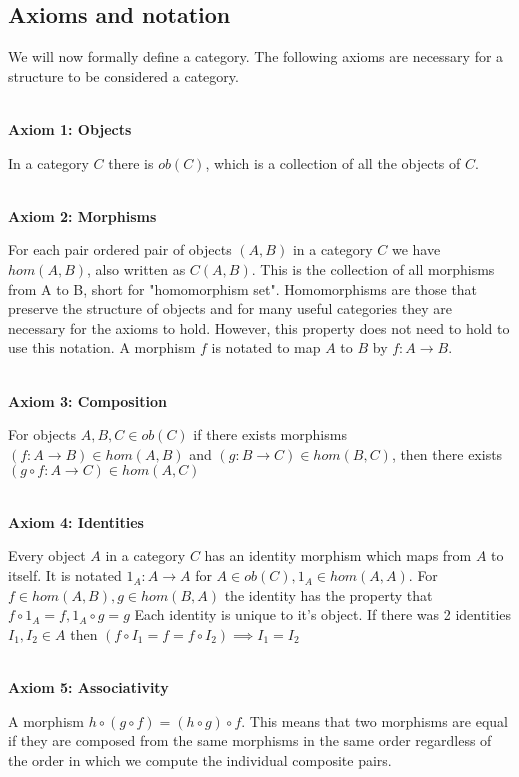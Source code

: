 \documentclass[10pt,a4paper]{amsart}
\begin{document}
\subsection{Axioms and notation}
\begin{flushleft}
We will now formally define a category. The following axioms are necessary for a structure to be considered a category.\\\;\\

\begin{center}\textbf{Axiom 1: Objects}\end{center}

In a category $C$ there is $ob(C)$, which is a collection of all the objects of $C$.\\\;\\
\begin{center}\textbf{Axiom 2: Morphisms}\end{center}

For each pair ordered pair of objects $(A,B)$ in a category $C$ we have $hom(A,B)$, also written as $C(A,B)$.
This is the collection of all morphisms from A to B, short for "homomorphism set".
Homomorphisms are those that preserve the structure of objects and for many useful categories they are necessary for the axioms to hold.
However, this property does not need to hold to use this notation.
A morphism $f$ is notated to map $A$ to $B$ by $f: A\to B$.\\\;\\

\begin{center}\textbf{Axiom 3: Composition}\end{center}

For objects $A,B,C\in ob(C)$ if there exists morphisms $(f: A\to B)\in hom(A,B)$ and $(g: B\to C)\in hom(B,C)$, then there exists $(g\circ f: A\to C)\in hom(A,C)$\\\;\\

\begin{center}\textbf{Axiom 4: Identities}\end{center}

Every object $A$ in a category $C$ has an identity morphism which maps from $A$ to itself.
It is notated $1_A: A\to A$ for $A\in ob(C), 1_A\in hom(A,A)$.
For $f\in hom(A,B), g\in hom(B,A)$ the identity has the property that $f\circ 1_A = f, 1_A\circ g = g$
Each identity is unique to it's object. If there was 2 identities $I_1,I_2\in A$ then $(f\circ I_1 = f = f\circ I_2) \implies I_1=I_2$\\\;\\


\begin{center}\textbf{Axiom 5: Associativity}\end{center}


A morphism $h\circ(g\circ f) = (h\circ g)\circ f$. 
This means that two morphisms are equal if they are composed from the same morphisms in the same order
regardless of the order in which we compute the individual composite pairs.
\end{flushleft}
\end{document}
